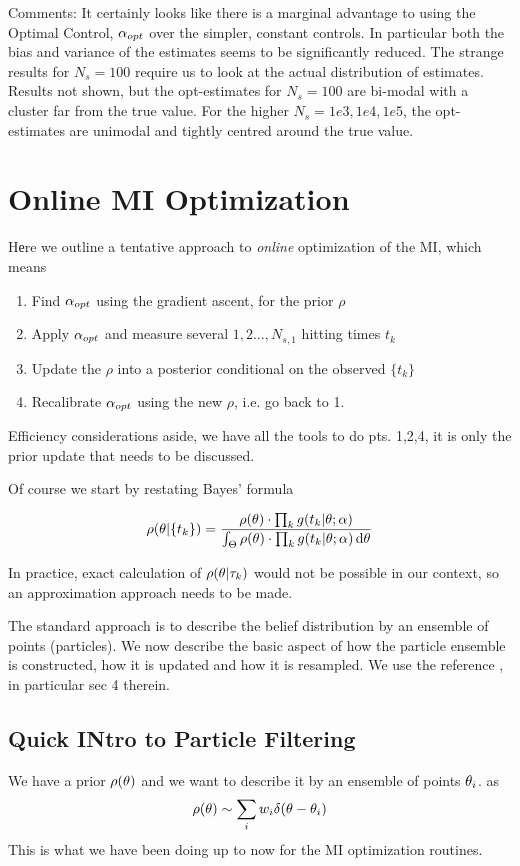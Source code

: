 \documentclass{article}
\begin{document}
Comments: It certainly looks like there is a marginal advantage to using the 
Optimal Control, ${\alpha}_{opt}$ over the simpler, constant controls. In particular
both the bias and variance of the estimates seems to be significantly reduced.
The strange results for $N_s = 100$ require us to look at the actual
distribution of estimates. Results not shown, but the opt-estimates for
$N_s=100$ are bi-modal with a cluster far from the true value. For the higher
$N_s = 1e3,1e4, 1e5$, the opt-estimates are unimodal and tightly centred
around the true value.


\clearpage

\section{Online MI Optimization}
Hеre we outline a tentative approach to {\sl online} optimization of the MI,
which means

\begin{enumerate}
  \item Find ${{\alpha}_{opt} }$ using the gradient ascent, for the prior $\rho$
  \item Apply ${{\alpha}_{opt} }$ and measure several $1,2\ldots,N_{s,1}$ hitting times
  $t_k$
  \item Update the $\rho$ into a posterior conditional on the observed $\{t_k\}$
  \item Recalibrate ${{\alpha}_{opt} }$ using the new $\rho$, i.e. go back to 1. 
\end{enumerate}

 Efficiency considerations aside, we have all the tools to do pts. 1,2,4, it
 is only the prior update that needs to be discussed. 

Of course we start by restating Bayes' formula

$$
\rho({\theta}| \{t_k\} ) = 
\frac{  \rho({\theta}) \cdot \prod_k g(t_k|{\theta} ; {\alpha}) }
	 { \int_{\Theta}  \rho({\theta}) \cdot \prod_k g(t_k|{\theta} ; {\alpha})  \, \mathrm{d} {\theta}}
$$

In practice, exact calculation of $\rho({\theta}|{\tau}_k)$ would not be possible in our
context, so an approximation approach needs to be made.

The standard approach is to describe the belief distribution by an ensemble of
points (particles). We now describe the basic aspect of how the particle
ensemble is constructed, how it is updated and how it is resampled. We use the
reference \cite{Granade2012}, in particular sec 4 therein.

\subsection{Quick INtro to Particle Filtering}
We have a prior
$ \rho({\theta})$ and we want to describe it by an ensemble of points ${\theta}_i$.
as 
$$ \rho({\theta}) \sim \sum_i w_i \delta({\theta}-{\theta}_i)$$
This is what we have been doing up to now for the MI optimization routines.
\end{document}
